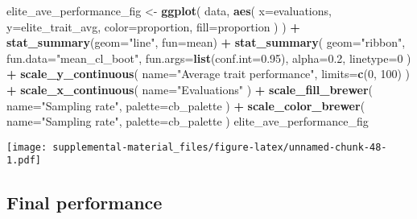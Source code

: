 \documentclass[]{book}
\newenvironment{Shaded}{\begin{snugshade}}{\end{snugshade}}
\newcommand{\DataTypeTok}[1]{\textcolor[rgb]{0.13,0.29,0.53}{#1}}
\newcommand{\DecValTok}[1]{\textcolor[rgb]{0.00,0.00,0.81}{#1}}
\newcommand{\FloatTok}[1]{\textcolor[rgb]{0.00,0.00,0.81}{#1}}
\newcommand{\KeywordTok}[1]{\textcolor[rgb]{0.13,0.29,0.53}{\textbf{#1}}}
\newcommand{\NormalTok}[1]{#1}
\newcommand{\OperatorTok}[1]{\textcolor[rgb]{0.81,0.36,0.00}{\textbf{#1}}}
\newcommand{\StringTok}[1]{\textcolor[rgb]{0.31,0.60,0.02}{#1}}
\begin{document}
\begin{Shaded}
\begin{Highlighting}[]
\NormalTok{elite_ave_performance_fig <-}
\StringTok{  }\KeywordTok{ggplot}\NormalTok{(}
\NormalTok{    data,}
    \KeywordTok{aes}\NormalTok{(}
      \DataTypeTok{x=}\NormalTok{evaluations,}
      \DataTypeTok{y=}\NormalTok{elite_trait_avg,}
      \DataTypeTok{color=}\NormalTok{proportion,}
      \DataTypeTok{fill=}\NormalTok{proportion}
\NormalTok{    )}
\NormalTok{  ) }\OperatorTok{+}
\StringTok{  }\KeywordTok{stat_summary}\NormalTok{(}\DataTypeTok{geom=}\StringTok{"line"}\NormalTok{, }\DataTypeTok{fun=}\NormalTok{mean) }\OperatorTok{+}
\StringTok{  }\KeywordTok{stat_summary}\NormalTok{(}
    \DataTypeTok{geom=}\StringTok{"ribbon"}\NormalTok{,}
    \DataTypeTok{fun.data=}\StringTok{"mean_cl_boot"}\NormalTok{,}
    \DataTypeTok{fun.args=}\KeywordTok{list}\NormalTok{(}\DataTypeTok{conf.int=}\FloatTok{0.95}\NormalTok{),}
    \DataTypeTok{alpha=}\FloatTok{0.2}\NormalTok{,}
    \DataTypeTok{linetype=}\DecValTok{0}
\NormalTok{  ) }\OperatorTok{+}
\StringTok{  }\KeywordTok{scale_y_continuous}\NormalTok{(}
    \DataTypeTok{name=}\StringTok{"Average trait performance"}\NormalTok{,}
    \DataTypeTok{limits=}\KeywordTok{c}\NormalTok{(}\DecValTok{0}\NormalTok{, }\DecValTok{100}\NormalTok{)}
\NormalTok{  ) }\OperatorTok{+}
\StringTok{  }\KeywordTok{scale_x_continuous}\NormalTok{(}
    \DataTypeTok{name=}\StringTok{"Evaluations"}
\NormalTok{  ) }\OperatorTok{+}
\StringTok{  }\KeywordTok{scale_fill_brewer}\NormalTok{(}
    \DataTypeTok{name=}\StringTok{"Sampling rate"}\NormalTok{,}
    \DataTypeTok{palette=}\NormalTok{cb_palette}
\NormalTok{  ) }\OperatorTok{+}
\StringTok{  }\KeywordTok{scale_color_brewer}\NormalTok{(}
    \DataTypeTok{name=}\StringTok{"Sampling rate"}\NormalTok{,}
    \DataTypeTok{palette=}\NormalTok{cb_palette}
\NormalTok{  )}
\NormalTok{elite_ave_performance_fig}
\end{Highlighting}
\end{Shaded}

\texttt{[image: supplemental-material\_files/figure-latex/unnamed-chunk-48-1.pdf]}

\hypertarget{final-performance-4}{%
\subsection{Final performance}\label{final-performance-4}}
\end{document}
